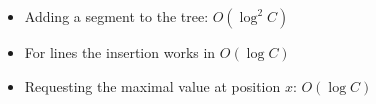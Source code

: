 \begin{itemize}
	\item Adding a segment to the tree: $O(\log^2{C})$
  \item For lines the insertion works in $O(\log{C})$
  \item Requesting the maximal value at position $x$: $O(\log{C})$
\end{itemize}
